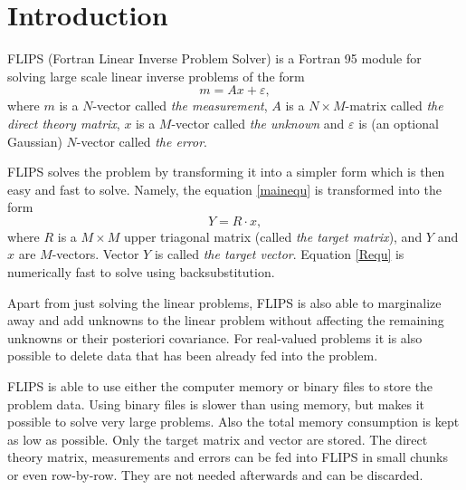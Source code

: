 \documentclass[a4paper,twoside]{refrep}
\begin{document}
\chapter{Introduction}\label{intro}

FLIPS (Fortran Linear Inverse Problem Solver) is a Fortran 95 module for solving large scale linear inverse problems of the form
\begin{equation}\label{mainequ}
m=Ax+\varepsilon,
\end{equation}
where $m$ is a $N$-vector called \emph{the measurement}, $A$ is a $N\times M$-matrix called \emph{the direct theory matrix}, $x$ is a $M$-vector called \emph{the unknown} and $\varepsilon$ is (an optional Gaussian) $N$-vector called \emph{the error}.

FLIPS solves the problem by transforming it into a simpler form which is then easy and fast to solve. Namely, the equation \eqref{mainequ} is transformed into the form
\begin{equation}\label{Requ}
Y=R\cdot x,
\end{equation}
where $R$ is a $M\times M$ upper triagonal matrix (called \emph{the target matrix}), and $Y$ and $x$ are $M$-vectors. Vector $Y$ is called \emph{the target vector}. Equation \eqref{Requ} is numerically fast to solve using backsubstitution.

Apart from just solving the linear problems, FLIPS is also able to marginalize away and add unknowns to the linear problem without affecting the remaining unknowns or their posteriori covariance. For real-valued problems it is also possible to delete data that has been already fed into the problem. 
  
FLIPS is able to use either the computer memory or binary files to store the problem data. Using binary files is slower than using memory, but makes it possible to solve very large problems. Also the total memory consumption is kept as low as possible. Only the target matrix and vector are stored. The direct theory matrix, measurements and errors can be fed into FLIPS in small chunks or even row-by-row. They are not needed afterwards and can be discarded.

\end{document}
